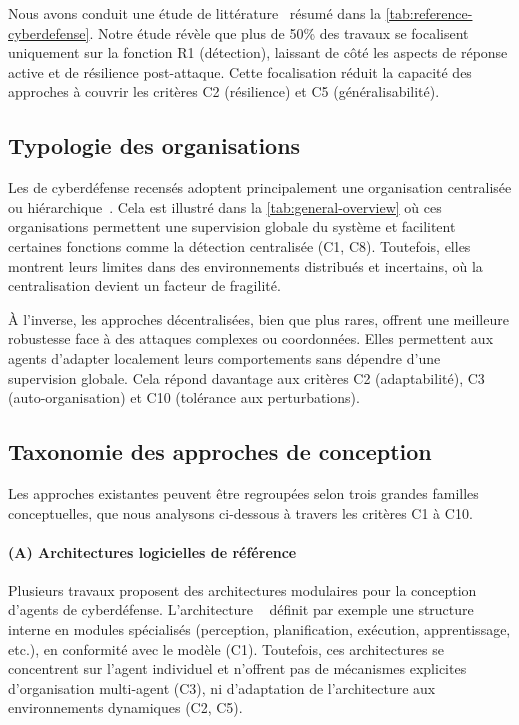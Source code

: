 Nous avons conduit une étude de littérature~\cite{soule2023rjciathese} résumé dans la \autoref{tab:reference-cyberdefense}. Notre étude révèle que plus de 50\% des travaux se focalisent uniquement sur la fonction R1 (détection), laissant de côté les aspects de réponse active et de résilience post-attaque. Cette focalisation réduit la capacité des approches à couvrir les critères C2 (résilience) et C5 (généralisabilité).



\subsection*{Typologie des organisations}

Les  de cyberdéfense recensés adoptent principalement une organisation centralisée ou hiérarchique~\cite{soule2023ressithese}. Cela est illustré dans la \autoref{tab:general-overview} où ces organisations permettent une supervision globale du système et facilitent certaines fonctions comme la détection centralisée (C1, C8). Toutefois, elles montrent leurs limites dans des environnements distribués et incertains, où la centralisation devient un facteur de fragilité.

À l'inverse, les approches décentralisées, bien que plus rares, offrent une meilleure robustesse face à des attaques complexes ou coordonnées. Elles permettent aux agents d'adapter localement leurs comportements sans dépendre d'une supervision globale. Cela répond davantage aux critères C2 (adaptabilité), C3 (auto-organisation) et C10 (tolérance aux perturbations).



\subsection*{Taxonomie des approches de conception}

Les approches existantes peuvent être regroupées selon trois grandes familles conceptuelles, que nous analysons ci-dessous à travers les critères C1 à C10.

\paragraph{(A) Architectures logicielles de référence}

Plusieurs travaux proposent des architectures modulaires pour la conception d'agents de cyberdéfense. L'architecture ~\cite{Kott2023} définit par exemple une structure interne en modules spécialisés (perception, planification, exécution, apprentissage, etc.), en conformité avec le modèle  (C1). Toutefois, ces architectures se concentrent sur l'agent individuel et n'offrent pas de mécanismes explicites d'organisation multi-agent (C3), ni d'adaptation de l'architecture aux environnements dynamiques (C2, C5).

